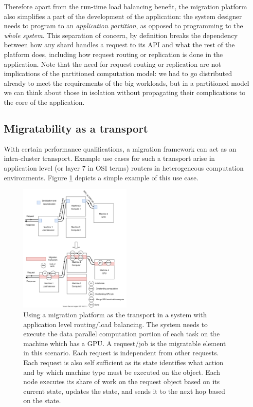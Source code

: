 Therefore apart from the run-time load balancing benefit, the
    migration platform also simplifies a part of the development of the
    application: the system designer needs to program to an
    \emph{application partition}, as opposed to programming to the
    \emph{whole system}. This separation of concern,
    by definition breaks the dependency between how
    any shard handles a request to its API and what the rest of the
    platform does, including how request routing or replication is done
    in the application. Note that the need for request routing or
    replication are not implications of the partitioned computation
    model: we had to go distributed already to meet the requirements of
    the big workloads, but in a partitioned model we can think about those
    in isolation without propagating their complications to the
    core of the application.


\subsection{Migratability as a transport}
With certain performance qualifications, a migration framework can act as
an intra-cluster transport. Example use cases for such a transport arise
in application level (or layer 7 in OSI terms) routers in heterogeneous
computation environments. Figure \ref{fig:migrationtransport} depicts
a simple example of this use case. 

\begin{figure}[t]
\centering

\includegraphics[width=0.5\textwidth]{migration-transport.drawio}
\caption{
    Using a migration platform as the transport in a system with
    application level routing/load balancing. The system needs to execute
    the data parallel computation portion of each task on the machine
    which has a GPU. A request/job is the
    migratable element in this scenario. Each request is independent
    from other requests. Each request is also self sufficient as its
    state identifies what action and by which machine type must be
    executed on the object. Each node executes its share of work
    on the request object based on its current state, updates the state,
    and sends it to the next hop based on the state.
}
\label{fig:migrationtransport}
\end{figure}



